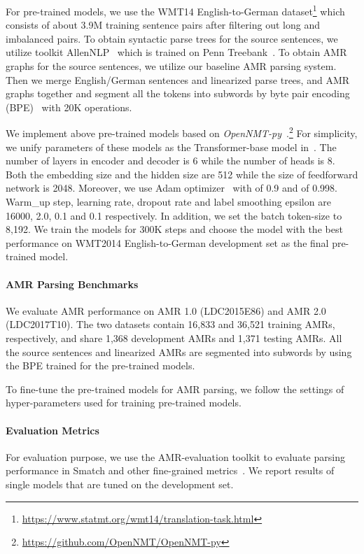\documentclass[11pt,a4paper]{article}
\newcommand{\ignore}[1]{}
\begin{document}
For pre-trained models, we use the WMT14 English-to-German dataset\footnote{\url{https://www.statmt.org/wmt14/translation-task.html}} which consists of about 3.9M training sentence pairs after filtering out long and imbalanced pairs. To obtain syntactic parse trees for the source sentences, we utilize toolkit AllenNLP~\citep{gardner_etal_acl_2017} which is trained on Penn Treebank~\cite{marcus_etal_cl_1993}. To obtain AMR graphs for the source sentences, we utilize our baseline AMR parsing system. Then we merge English/German sentences and linearized parse trees, and AMR graphs together and segment all the tokens into subwords by byte pair encoding (BPE)~\cite{sennrich_etal_acl_2016} with 20K operations. 

We implement above pre-trained models based on \textit{OpenNMT-py}~\cite{klein_etal_acl_2017}.\footnote{\url{https://github.com/OpenNMT/OpenNMT-py}} For simplicity, we unify parameters of these models as the Transformer-base model in~\citet{vaswani_etal_nips_2017}. The number of layers in encoder and decoder is 6 while the number of heads\ignore{ for transformer attention} is 8. Both the embedding size and the hidden size are 512 while the size of feedforward network is 2048. Moreover, we use Adam optimizer~\cite{kingma_ba_iclr_2015} with  of 0.9 and  of 0.998. Warm\_up step, learning rate, dropout rate and label smoothing epsilon are 16000, 2.0, 0.1 and 0.1 respectively. In addition, we set the batch token-size to 8,192. We train the models for 300K steps and choose the model with the best performance on WMT2014 English-to-German development set as the final pre-trained model.

\paragraph{AMR Parsing Benchmarks}
We evaluate AMR performance on AMR 1.0 (LDC2015E86) and AMR 2.0 (LDC2017T10). The two datasets contain 16,833 and 36,521 training AMRs, respectively, and share 1,368 development AMRs and 1,371 testing AMRs. All the source sentences and linearized AMRs are segmented into subwords by using the BPE trained for the pre-trained models. 

To fine-tune the pre-trained models for AMR parsing, we follow the settings of hyper-parameters used for training pre-trained models.

\paragraph{Evaluation Metrics}
For evaluation purpose, we use the AMR-evaluation toolkit to evaluate parsing performance in Smatch and other fine-grained metrics~\cite{cai_knight_eacl_2013,damonte_etal_eacl_2017}. We report results of single models that are tuned on the development set.
\end{document}
